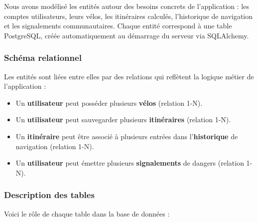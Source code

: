 Nous avons modélisé les entités autour des besoins concrets de l'application : les comptes utilisateurs, leurs vélos, les itinéraires calculés, l'historique de navigation et les signalements communautaires. Chaque entité correspond à une table PostgreSQL, créée automatiquement au démarrage du serveur via SQLAlchemy.

\subsubsection{Schéma relationnel}

Les entités sont liées entre elles par des relations qui reflètent la logique métier de l'application :
\begin{itemize}
    \item Un \textbf{utilisateur} peut posséder plusieurs \textbf{vélos} (relation 1-N).
    \item Un \textbf{utilisateur} peut sauvegarder plusieurs \textbf{itinéraires} (relation 1-N).
    \item Un \textbf{itinéraire} peut être associé à plusieurs entrées dans l'\textbf{historique} de navigation (relation 1-N).
    \item Un \textbf{utilisateur} peut émettre plusieurs \textbf{signalements} de dangers (relation 1-N).
\end{itemize}

\subsubsection{Description des tables}

Voici le rôle de chaque table dans la base de données :

